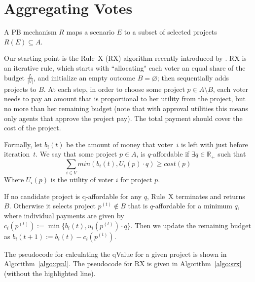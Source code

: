 \documentclass[runningheads]{llncs}
\begin{document}

\section{Aggregating Votes}\label{sec:agg}

A PB mechanism $R$ maps a scenario $E$ to a subset of selected projects $R(E)\subseteq A$.

Our starting point is the Rule~X (RX) algorithm recently introduced by \citet{peters2020proportional}. 
RX is an iterative rule, which starts with ``allocating" each voter an equal share of the budget $\frac{L}{|V|}$, and  initialize an empty outcome $B=\varnothing$; then sequentially adds projects to $B$. At each step, in order to choose some project $p\in A\setminus B$, each voter needs to pay an amount that is proportional to her utility from the project, but no more than her remaining budget (note that with approval utilities this means only agents that approve the project pay). The  total payment should cover the cost of the project. 
 
 Formally, let $b_i(t)$ be the amount of money that voter~$i$ is left with just before iteration~$t$.
 We say that some project $p\in A$, is $q$-affordable if $\exists q\in \mathbb{R}_+$ such that 
$$\sum_{i\in V}min(b_i(t),U_i(p)\cdot q)\geq cost(p)$$
Where $U_i(p)$ is the utility of voter $i$ for project $p$.

If no candidate project is q-affordable for any $q$, Rule~X terminates and returns $B$. Otherwise it selects project $p^{(t)}\notin B$ that is $q$-affordable for a minimum $q$, where individual payments are given by $c_i(p^{(t)}):=\min\{b_i(t),u_i(p^{(t)})\cdot q\}$. Then we update the remaining budget as $b_i(t+1):=b_i(t)-c_i(p^{(t)})$.

 The pseudocode for calculating the  qValue for a given project is shown in Algorithm~\ref{algo:qval}.  
The pseudocode for RX is given in Algorithm~\ref{algo:srx} (without the highlighted line).
\end{document}

